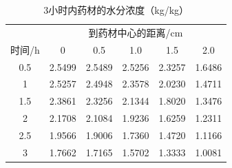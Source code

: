 \begin{table}[htbp]\centering\small
\caption{3小时内药材的水分浓度（kg/kg）}\label{tab_q2C}
\renewcommand{\arraystretch}{1.12}
\begin{tabular}{cccccc}\toprule
 & \multicolumn{5}{c}{到药材中心的距离/cm}\\
时间/h & 0 & 0.5 & 1.0 & 1.5 & 2.0\\\midrule
0.5 & 2.5499 & 2.5489 & 2.5256 & 2.3257 & 1.6486\\
1 & 2.5257 & 2.4948 & 2.3578 & 2.0230 & 1.4711\\
1.5 & 2.3861 & 2.3256 & 2.1344 & 1.8020 & 1.3476\\
2 & 2.1708 & 2.1084 & 1.9236 & 1.6259 & 1.2311\\
2.5 & 1.9566 & 1.9006 & 1.7360 & 1.4720 & 1.1166\\
3 & 1.7662 & 1.7165 & 1.5702 & 1.3333 & 1.0081\\
\bottomrule\end{tabular}
\end{table}
